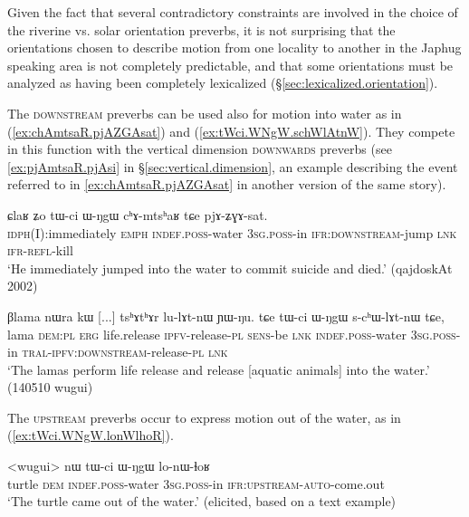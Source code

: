 Given the fact that several contradictory constraints are involved in the choice of the riverine vs. solar orientation preverbs, it is not surprising that the orientations chosen to describe motion from one locality to another in the Japhug speaking area is not completely predictable, and that some orientations must be analyzed as having been completely lexicalized (§\ref{sec:lexicalized.orientation}).

The \textsc{downstream} preverbs can be used also for motion into water as in (\ref{ex:chAmtsaR.pjAZGAsat}) and (\ref{ex:tWci.WNgW.schWlAtnW}). They compete in this function with the vertical dimension \textsc{downwards} preverbs (see \ref{ex:pjAmtsaR.pjAsi} in §\ref{sec:vertical.dimension}, an example describing the event referred to in \ref{ex:chAmtsaR.pjAZGAsat} in another version of the same story).
 
 \begin{exe}
\ex \label{ex:chAmtsaR.pjAZGAsat}
\gll ɕlaʁ ʑo tɯ-ci ɯ-ŋgɯ cʰɤ-mtsʰaʁ tɕe pjɤ-ʑɣɤ-sat. \\
\textsc{idph}(I):immediately \textsc{emph} \textsc{indef}.\textsc{poss}-water \textsc{3sg}.\textsc{poss}-in \textsc{ifr}:\textsc{downstream}-jump \textsc{lnk} \textsc{ifr}-\textsc{refl}-kill \\
\glt `He immediately jumped into the water to commit suicide and died.' (qajdoskAt 2002)
\end{exe}

\begin{exe}
\ex \label{ex:tWci.WNgW.schWlAtnW}
\gll  βlama nɯra kɯ [...] tsʰɤtʰɤr lu-lɤt-nɯ ɲɯ-ŋu.  tɕe tɯ-ci ɯ-ŋgɯ s-cʰɯ-lɤt-nɯ tɕe,  \\
 lama \textsc{dem}:\textsc{pl} \textsc{erg} { } life.release \textsc{ipfv}-release-\textsc{pl} \textsc{sens}-be \textsc{lnk} \textsc{indef}.\textsc{poss}-water \textsc{3sg}.\textsc{poss}-in \textsc{tral}-\textsc{ipfv}:\textsc{downstream}-release-\textsc{pl} \textsc{lnk}  \\
\glt `The lamas perform life release and release [aquatic animals] into the water.' (140510 wugui) 	
\end{exe}

The \textsc{upstream} preverbs occur to express motion out of the water, as in (\ref{ex:tWci.WNgW.lonWlhoR}).

\begin{exe}
\ex \label{ex:tWci.WNgW.lonWlhoR}
\gll <wugui> nɯ tɯ-ci ɯ-ŋgɯ lo-nɯ-ɬoʁ  \\
turtle \textsc{dem} \textsc{indef}.\textsc{poss}-water \textsc{3sg}.\textsc{poss}-in \textsc{ifr}:\textsc{upstream}-\textsc{auto}-come.out \\
\glt `The turtle came out of the water.' (elicited, based on a text example)
\end{exe}

